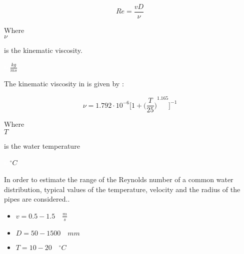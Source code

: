 \begin{equation}
   Re = \frac{vD}{\nu}
   \label{Reynolds}
 \end{equation}
 
  \begin{minipage}[t]{0.20\textwidth}
Where\\
\hspace*{8mm} $\nu$ 
\end{minipage}
\begin{minipage}[t]{0.68\textwidth}
\vspace*{2mm}
is the kinematic viscosity.

\end{minipage}
\begin{minipage}[t]{0.10\textwidth}
\vspace*{2mm}
\textcolor{White}{te}$\unit{\frac{kg}{ms}}$
\end{minipage}

The kinematic viscosity in \cite{Design_Water} is given by :

\begin{equation}
  \nu = 1.792 \cdot 10^{-6} \bigg[1+{\bigg(\frac{T}{25}\bigg)}^{1.165} \bigg]^{-1}
\end{equation}

  \begin{minipage}[t]{0.20\textwidth}
Where\\
\hspace*{8mm} $T$ 
\end{minipage}
\begin{minipage}[t]{0.68\textwidth}
\vspace*{2mm}
is the water temperature  
 \end{minipage}
\begin{minipage}[t]{0.10\textwidth}
\vspace*{2mm}
\textcolor{White}{te}$\unit{^{\circ} C}$
\end{minipage}

In order to estimate the range of the Reynolds number of a common water 
distribution, typical values of the temperature, velocity and the radius of 
the pipes are considered.\cite{Urban_Design}. 

\begin{itemize}
  \item $v = 0.5 - 1.5  \quad \frac{m}{s}$
  \item $D = 50 - 1500\quad mm$
  \item $T = 10 - 20 \quad ^{\circ} C$
\end{itemize}

